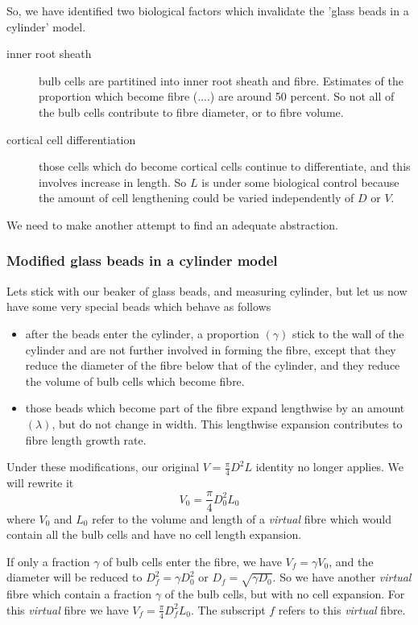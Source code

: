 \documentclass[titlepage]{article}  %
\begin{document}
So, we have identified two biological factors which invalidate the 'glass beads in a cylinder' model. 
\begin{description}
\item[inner root sheath] bulb cells are partitined into inner root sheath and fibre. Estimates of the proportion which become fibre (....) are around 50 percent. So not all of the bulb cells contribute to fibre diameter, or to fibre volume.\item[cortical cell differentiation] those cells which do become cortical cells continue to differentiate, and this involves increase in length. So $L$ is under some biological control because the amount of cell lengthening could be varied independently of $D$ or $V$. 
\end{description}

We need to make another attempt to find an adequate abstraction.

\subsubsection{Modified glass beads in a cylinder model}
Lets stick with our beaker of glass beads, and measuring cylinder, but let us now have some very special beads which behave as follows
\begin{itemize}
\item after the beads enter the cylinder, a proportion $(\gamma)$ stick to the wall of the cylinder and are not further involved in forming the fibre, except that they reduce the diameter of the fibre below that of the cylinder, and they reduce the volume of bulb cells which become fibre.
\item those beads which become part of the fibre expand lengthwise by an amount $(\lambda)$, but do not change in width. This lengthwise expansion contributes to fibre length growth rate.
\end{itemize}

Under these modifications, our original $V = \frac{\pi}{4} D^{2} L$ identity no longer applies. We will rewrite it
\begin{displaymath}
V_{0} = \frac{\pi}{4} D_{0}^{2} L_{0}
\end{displaymath}
where $V_{0}$ and $L_{0}$ refer to the volume and length of a {\em virtual} fibre which would contain all the bulb cells and have no cell length expansion.

If only a fraction $\gamma$ of bulb cells enter the fibre, we have $V_{f} = \gamma V_{0}$, and the diameter will be reduced to $D_{f}^{2} =  \gamma D_{0}^{2} $ or $D_{f} =  \sqrt{\gamma D_{0}} $. So we have another {\em virtual} fibre which contain a fraction $\gamma$ of the bulb cells, but with no cell expansion. For this {\em virtual} fibre we have $V_{f} = \frac{\pi}{4} D^{2}_{f} L_{0}$. The subscript $f$ refers to this {\em virtual} fibre.
\end{document}
